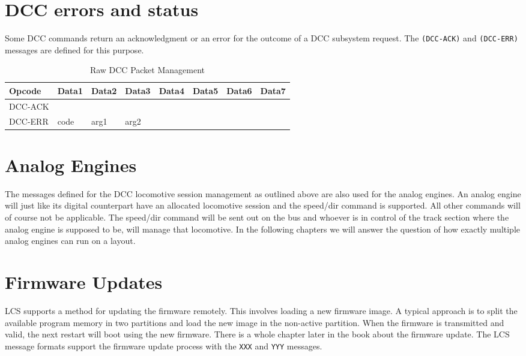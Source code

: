 \section{DCC errors and status}

Some DCC commands return an acknowledgment or an error for the outcome of a DCC subsystem request. The \texttt{(DCC-ACK)} and \texttt{(DCC-ERR)} messages are defined for this purpose.

\begin{table}[ht!]
    \begin{center}
        \caption{Raw DCC Packet Management}
        \begin{tabular}{|l|l|l|l|l|l|l|l|}
            \toprule
            \textbf{Opcode}  & \textbf{Data1} & \textbf{Data2} & \textbf{Data3} & \textbf{Data4} & \textbf{Data5} & \textbf{Data6} & \textbf{Data7} \\
            \midrule
            DCC-ACK & & & & & & & \\
            DCC-ERR & code & arg1 & arg2 & & & & \\
            \bottomrule
        \end{tabular}
    \end{center}
\end{table}

\section{Analog Engines}

The messages defined for the DCC locomotive session management as outlined above are also used for the analog engines. An analog engine will just like its digital counterpart have an allocated locomotive session and the speed/dir command is supported. All other commands will of course not be applicable. The speed/dir command will be sent out on the bus and whoever is in control of the track section where the analog engine is supposed to be, will manage that locomotive. In the following chapters we will answer the question of how exactly multiple analog engines can run on a layout.

\section{Firmware Updates}

LCS supports a method for updating the firmware remotely. This involves loading a new firmware image. A typical approach is to split the available program memory in two partitions and load the new image in the non-active partition. When the firmware is transmitted and valid, the next restart will boot using the new firmware. There is a whole chapter later in the book about the firmware update. The LCS message formats support the firmware update process with the \texttt{XXX} and \texttt{YYY} messages.

